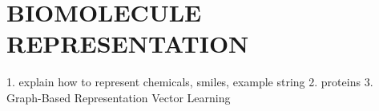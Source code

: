 \chapter{BIOMOLECULE REPRESENTATION}
1. explain how to represent chemicals, smiles, example string
2. proteins
3. Graph-Based Representation Vector Learning